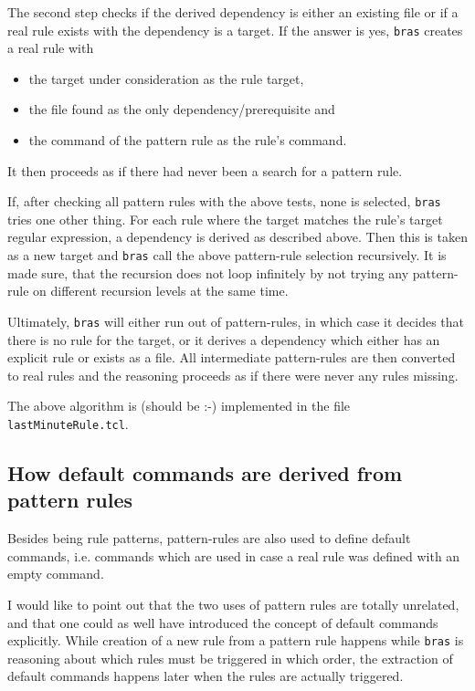 \documentclass[12pt]{article}
\newcommand{\bras}{\texttt{bras}}
\begin{document}
The second step checks if 
the derived dependency is either an existing file or if a real rule
exists with the dependency is a target.
If the answer is yes, \bras{} creates a real rule with
\begin{itemize}
\item the target under consideration as the rule target,
\item the file found as the only dependency/prerequisite and
\item the command of the pattern rule as the rule's command.
\end{itemize}
It then proceeds as if there had never been a search for a pattern
rule.

If, after checking all pattern rules with the above tests, none is
selected, \bras{} tries one other thing. For each rule where the
target matches the rule's target regular expression, a dependency is
derived as described above. Then this is taken as a new target and
\bras{} call the above pattern-rule selection recursively. It is made
sure, that the recursion does not loop infinitely by not trying any
pattern-rule on different recursion levels at the same time.

Ultimately, \bras{} will either run out of pattern-rules, in which
case it decides that there is no rule for the target, or it derives a
dependency which either has an explicit rule or exists as a file. All
intermediate pattern-rules are then converted to real rules and the
reasoning proceeds as if there were never any rules missing.

The above algorithm is (should be :-) implemented in the file
\texttt{lastMinuteRule.tcl}.

\subsection{How default commands are derived from pattern rules}
\label{secSuffixAsDefCmd}
Besides being rule patterns, pattern-rules are also used to define
default commands, i.e. commands which are used in case a real rule was
defined with an empty command.

I would like to point out that the two uses of pattern rules are
totally unrelated, and that one could as well have introduced the
concept of default commands explicitly. While creation of a new rule
from a pattern rule happens while \bras{} is reasoning about which rules
must be triggered in which order, the extraction of default commands
happens later when the rules are actually triggered. 
\end{document}

